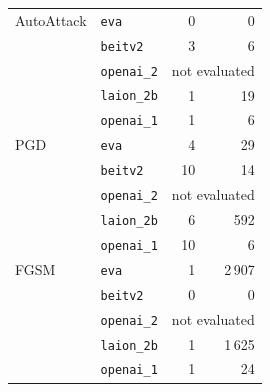 \begin{tabularx}{\textwidth}{Xlrr}
\midrule
AutoAttack & \texttt{eva} & 0 & 0 \\
 & \texttt{beitv2} & 3 & 6 \\
 & \texttt{openai\_2} & \multicolumn{2}{c}{not evaluated} \\
 & \texttt{laion\_2b} & 1 & 19 \\
 & \texttt{openai\_1} & 1 & 6 \\
PGD & \texttt{eva} & 4 & 29 \\
 & \texttt{beitv2} & 10 & 14 \\
 & \texttt{openai\_2} & \multicolumn{2}{c}{not evaluated} \\
 & \texttt{laion\_2b} & 6 & 592 \\
 & \texttt{openai\_1} & 10 & 6 \\
FGSM & \texttt{eva} & 1 & 2\,907 \\
 & \texttt{beitv2} & 0 & 0 \\
 & \texttt{openai\_2} & \multicolumn{2}{c}{not evaluated} \\
 & \texttt{laion\_2b} & 1 & 1\,625 \\
 & \texttt{openai\_1} & 1 & 24 \\
\bottomrule
\end{tabularx}
